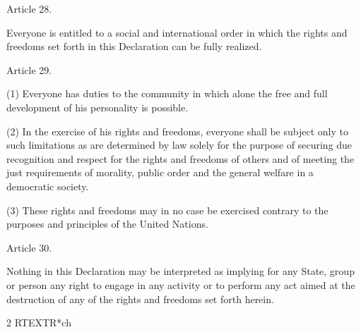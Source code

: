 \documentclass[11pt,a4paper]{article}
\begin{document}
Article 28.

Everyone is entitled to a social and international order in which the rights and freedoms set forth in this Declaration can be fully realized.

Article 29.

(1) Everyone has duties to the community in which alone the free and full development of his personality is possible.

(2) In the exercise of his rights and freedoms, everyone shall be subject only to such limitations as are determined by law solely for the purpose of securing due recognition and respect for the rights and freedoms of others and of meeting the just requirements of morality, public order and the general welfare in a democratic society.

(3) These rights and freedoms may in no case be exercised contrary to the purposes and principles of the United Nations.

Article 30.

Nothing in this Declaration may be interpreted as implying for any State, group or person any right to engage in any activity or to perform any act aimed at the destruction of any of the rights and freedoms set forth herein.

2 RTEXTR*ch
\end{document}
